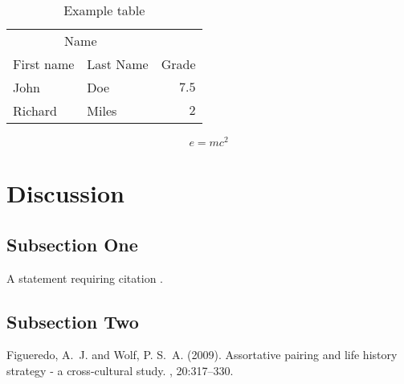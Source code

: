 \documentclass[twoside,twocolumn]{article}
\begin{document}
    \begin{table}
    \caption{Example table}
    \centering
    \begin{tabular}{llr}
    \toprule
    \multicolumn{2}{c}{Name} \\
    \cmidrule(r){1-2}
    First name & Last Name & Grade \\
    \midrule
    John & Doe & $7.5$ \\
    Richard & Miles & $2$ \\
    \bottomrule
    \end{tabular}
    \end{table}
    
    \blindtext %
    
    \begin{equation}
    \label{eq:emc}
    e = mc^2
    \end{equation}
    
    \blindtext %
    
    
    \section{Discussion}
    
    \subsection{Subsection One}
    
    A statement requiring citation \cite{Figueredo:2009dg}.
    \blindtext %
    
    \subsection{Subsection Two}
    
    \blindtext %
    
    
    \begin{thebibliography}{99} %
    
    Figueredo, A.~J. and Wolf, P. S.~A. (2009).
    \newblock Assortative pairing and life history strategy - a cross-cultural
      study.
    , 20:317--330.
     
    \end{thebibliography}
    
    
    
\end{document}
